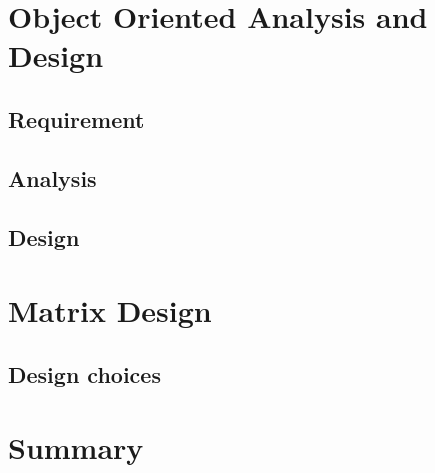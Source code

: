 \section{Object Oriented Analysis and Design}

\subsection{Requirement}

\subsection{Analysis}

\subsection{Design}

\section{Matrix Design}

\subsection{Design choices}




\section{Summary}